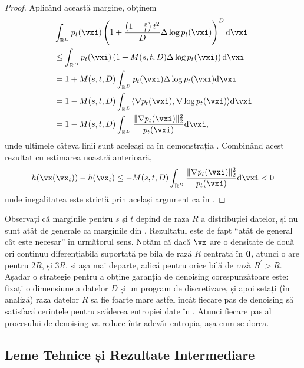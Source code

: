 \documentclass[../../book-main_ro.tex]{subfiles}
\begin{document}
\begin{proof}
    Aplicând această margine, obținem
    \begin{align}
        &\int_{\R^{D}} p_{t}(\vxi)\bp{1 + \frac{\bp{1 - \frac{s}{t}}t^{2}}{D}\Delta \log p_{t}(\vxi)}^{D}\odif{\vxi} \\ 
        &\leq \int_{\R^{D}}p_{t}(\vxi)\bp{1 + M(s, t, D)\Delta \log p_{t}(\vxi)}\odif{\vxi} \\
        &= 1 + M(s, t, D)\int_{\R^{D}}p_{t}(\vxi)\Delta \log p_{t}(\vxi)\odif{\vxi} \\
        &= 1 - M(s, t, D)\int_{\R^{D}}\ip{\nabla p_{t}(\vxi)}{\nabla\log p_{t}(\vxi)}\odif{\vxi} \\
        &= 1 - M(s, t, D)\int_{\R^{D}}\frac{\norm{\nabla p_{t}(\vxi)}_{2}^{2}}{p_{t}(\vxi)}\odif{\vxi},
    \end{align}
    unde ultimele câteva linii sunt aceleași ca în demonstrația . Combinând acest rezultat cu estimarea noastră anterioară,
    \begin{equation}
        h(\bar{\vx}(\vx_{t})) - h(\vx_{t}) \leq - M(s, t, D)\int_{\R^{D}}\frac{\norm{\nabla p_{t}(\vxi)}_{2}^{2}}{p_{t}(\vxi)}\odif{\vxi} < 0
    \end{equation}
    unde inegalitatea este strictă prin același argument ca în .
\end{proof}

Observați că marginile pentru \(s\) și \(t\) depind de raza \(R\) a distribuției datelor, și nu sunt atât de generale ca marginile din . Rezultatul este de fapt ``atât de general cât este necesar'' în următorul sens. Notăm că dacă \(\vx\) are o densitate de două ori continuu diferențiabilă suportată pe bila de rază \(R\) centrată în \(\bm{0}\), atunci o are pentru \(2R\), și \(3R\), și așa mai departe, adică pentru orice bilă de rază \(R^{\prime} > R\). Așadar o strategie pentru a obține garanția de denoising corespunzătoare este: fixați o dimensiune a datelor \(D\) și un program de discretizare, și apoi setați (în analiză) raza datelor \(R\) să fie foarte mare astfel încât fiecare pas de denoising să satisfacă cerințele pentru scăderea entropiei date în . Atunci fiecare pas al procesului de denoising va reduce într-adevăr entropia, așa cum se dorea.

 
\subsection{Leme Tehnice și Rezultate Intermediare}\label{sub:app_diffusion_intermediate_results}
\end{document}
